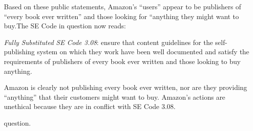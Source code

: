 \documentclass[11pt]{article}
\begin{document}
\begin{multicols}{2}
Based on these public statements, Amazon's ``users'' appear to be publishers of ``every book ever written'' and those looking for ``anything they might want to buy.The SE Code in question now reads:

\emph{Fully Substituted SE Code 3.08}: ensure that content guidelines for the self-publishing system on which they work have been well documented and satisfy the requirements of publishers of every book ever written and those looking to buy anything.  

Amazon is clearly not publishing every book ever written, nor are they providing ``anything'' that their customers might want to buy.  Amazon's actions are unethical because they are in conflict with SE Code 3.08.

question.


\end{multicols}
\end{document}

